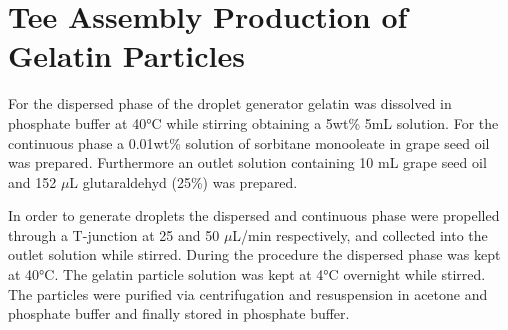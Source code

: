 \section{Tee Assembly Production of Gelatin Particles}
For the dispersed phase of the droplet generator gelatin was dissolved in phosphate buffer at 40\si{\degreeCelsius} while stirring obtaining a 5wt\% 5mL solution. 
For the continuous phase a 0.01wt\% solution of sorbitane monooleate in grape seed oil was prepared. Furthermore an outlet solution containing 10 mL grape seed oil and 152 $\mu$L glutaraldehyd (25\%) was prepared. %

In order to generate droplets the dispersed and continuous phase were propelled through a T-junction at 25 and 50 $\mu$L/min respectively, and collected into the outlet solution while stirred. During the procedure the dispersed phase was kept at 40\si{\degreeCelsius}. The gelatin particle solution was kept at 4\si{\degreeCelsius} overnight while stirred. The particles were purified via centrifugation and resuspension in acetone and phosphate buffer and finally stored in phosphate buffer.